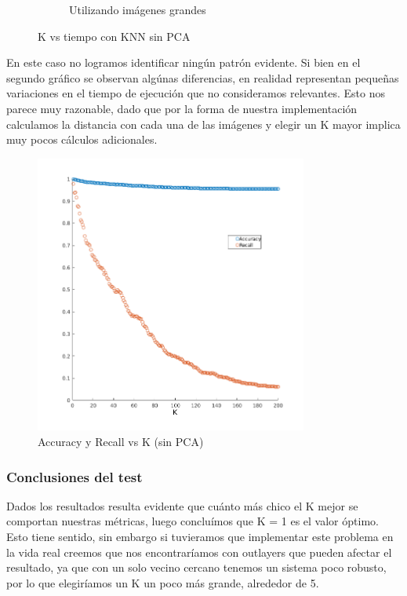 \begin{figure}[H]
\begin{subfigure}[h]{0.62\linewidth}
\caption{Utilizando imágenes grandes}
\end{subfigure}%
\caption{K vs tiempo con KNN sin PCA}
\end{figure}


En este caso no logramos identificar ningún patrón evidente. Si bien en el segundo gráfico se observan algúnas diferencias, en realidad representan pequeñas variaciones en el tiempo de ejecución que no consideramos relevantes.
Esto nos parece muy razonable, dado que por la forma de nuestra implementación calculamos la distancia con cada una de las imágenes y elegir un K mayor implica muy pocos cálculos adicionales.

\begin{figure}[H]
	\centering
	\includegraphics[width=0.8\textwidth]{img/Acc_recall_k_knn.png}
	\caption{Accuracy y Recall vs K (sin PCA)}
	\label{fig: Accuracy y Recall vs K (sin PCA)}
\end{figure}








\subsubsection*{Conclusiones del test}
Dados los resultados resulta evidente que cuánto más chico el K mejor se comportan nuestras métricas, luego concluímos que K = 1 es el valor óptimo.
Esto tiene sentido, sin embargo si tuvieramos que implementar este problema en la vida real creemos que nos encontraríamos con outlayers que pueden afectar el resultado, ya que con un solo vecino cercano tenemos un sistema poco robusto, por lo que elegiríamos un K un poco más grande, alrededor de 5.






